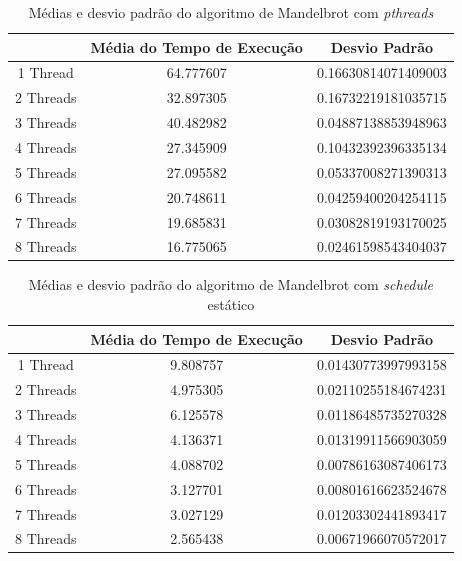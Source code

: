 \documentclass[10pt,a4paper]{article}
\begin{document}
		\begin{table}[htb]
			\begin{tabular}{|c|c|c|}
				\hline
				& Média do Tempo de Execução & Desvio Padrão\\ \hline
				1 Thread  & 64.777607 & 0.16630814071409003 \\ \hline
				2 Threads & 32.897305 & 0.16732219181035715 \\ \hline
				3 Threads & 40.482982 & 0.04887138853948963 \\ \hline
				4 Threads & 27.345909 & 0.10432392396335134 \\ \hline
				5 Threads & 27.095582 & 0.05337008271390313 \\ \hline
				6 Threads & 20.748611 & 0.04259400204254115 \\ \hline
				7 Threads & 19.685831 & 0.03082819193170025 \\ \hline
				8 Threads & 16.775065 & 0.02461598543404037 \\ \hline
			\end{tabular}
			\caption{Médias e desvio padrão do algoritmo de Mandelbrot com \textit{pthreads}}
		\end{table}

		\begin{table}[htb]
			\begin{tabular}{|c|c|c|}
				\hline
				& Média do Tempo de Execução & Desvio Padrão \\ \hline
				1 Thread  & 9.808757 & 0.01430773997993158 \\ \hline
				2 Threads & 4.975305 & 0.02110255184674231 \\ \hline
				3 Threads & 6.125578 & 0.01186485735270328 \\ \hline
				4 Threads & 4.136371 & 0.01319911566903059 \\ \hline
				5 Threads & 4.088702 & 0.00786163087406173 \\ \hline
				6 Threads & 3.127701 & 0.00801616623524678 \\ \hline
				7 Threads & 3.027129 & 0.01203302441893417 \\ \hline
				8 Threads & 2.565438 & 0.00671966070572017 \\ \hline
			\end{tabular}
			\caption{Médias e desvio padrão do algoritmo de Mandelbrot com \textit{schedule} estático}
		\end{table}
\end{document}
